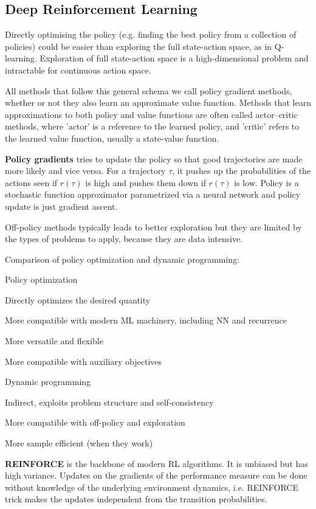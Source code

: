\documentclass[12pt]{article}
\begin{document}
\subsection{Deep Reinforcement Learning}
\par Directly optimising the policy (e.g. finding the best policy from a collection of policies) could be easier than exploring the full state-action space, as in Q-learning. Exploration of full state-action space is a high-dimensional problem and intractable for continuous action space.
\par All methods that follow this general schema we call policy gradient methods, whether or not they also learn an approximate value function. Methods that learn approximations to both policy and value functions are often called actor–critic methods, where 'actor' is a reference to the learned policy, and 'critic' refers to the learned value function, usually a state-value function.
\par \textbf{Policy gradients} tries to update the policy so that good trajectories are made more likely and vice versa. For a trajectory $\tau$, it pushes up the probabilities of the actions seen if $r(\tau)$ is high and pushes them down if $r(\tau)$ is low. Policy is a stochastic function approximator parametrized via a neural network and policy update is just gradient ascent.
\par Off-policy methods typically leads to better exploration but they are limited by the types of problems to apply, because they are data intensive.
\par Comparison of policy optimization and dynamic programming:
\ulb
\item Policy optimization
\ulb
\item Directly optimizes the desired quantity
\item More compatible with modern ML machinery, including NN and recurrence
\item More versatile and flexible
\item More compatible with auxiliary objectives
\ule
\item Dynamic programming
\ulb
\item Indirect, exploits problem structure and self-consistency
\item More compatible with off-policy and exploration
\item More sample efficient (when they work)
\ule
\ule
\par \textbf{REINFORCE} is the backbone of modern RL algorithms. It is unbiased but has high variance. Updates on the gradients of the performance measure can be done without knowledge of the underlying environment dynamics, i.e. REINFORCE trick makes the updates independent from the transition probabilities.
\end{document}
